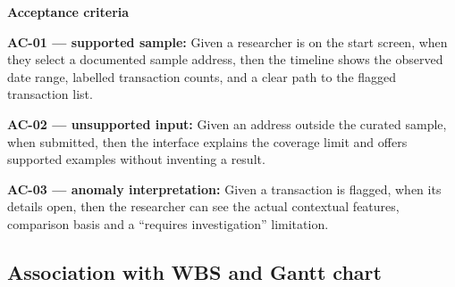 \textbf{Acceptance criteria}

\textbf{AC-01 — supported sample:} Given a researcher is on the start screen, when they select a documented sample address, then the timeline shows the observed date range, labelled transaction counts, and a clear path to the flagged transaction list.

\textbf{AC-02 — unsupported input:} Given an address outside the curated sample, when submitted, then the interface explains the coverage limit and offers supported examples without inventing a result.

\textbf{AC-03 — anomaly interpretation:} Given a transaction is flagged, when its details open, then the researcher can see the actual contextual features, comparison basis and a “requires investigation” limitation.

\subsection{Association with WBS and Gantt chart}
\label{sec:traceability}


